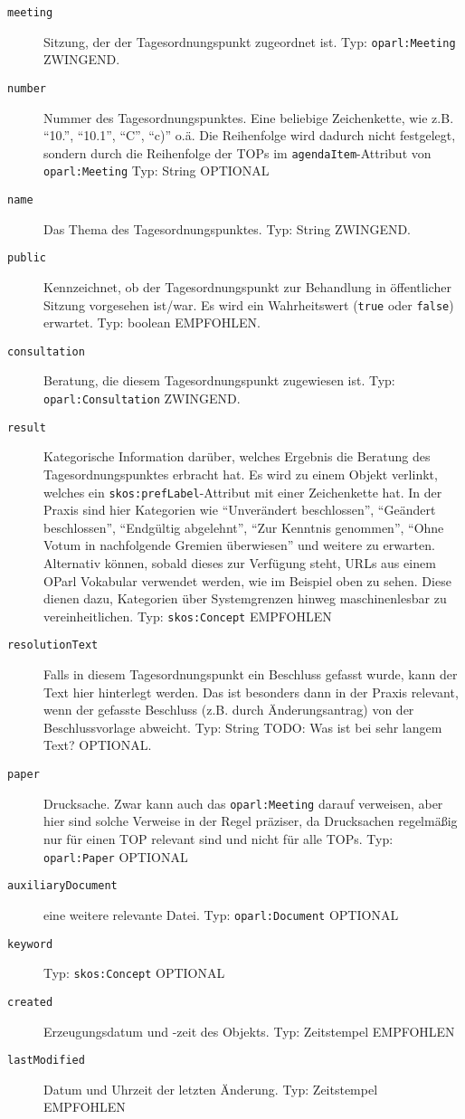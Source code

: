 \documentclass[,a4paper]{article}
\begin{document}
\begin{description}
\item[\texttt{meeting}]
Sitzung, der der Tagesordnungspunkt zugeordnet ist. Typ:
\texttt{oparl:Meeting} ZWINGEND.
\item[\texttt{number}]
Nummer des Tagesordnungspunktes. Eine beliebige Zeichenkette, wie z.B.
``10.'', ``10.1'', ``C'', ``c)'' o.ä. Die Reihenfolge wird dadurch nicht
festgelegt, sondern durch die Reihenfolge der TOPs im
\texttt{agendaItem}-Attribut von \texttt{oparl:Meeting} Typ: String
OPTIONAL
\item[\texttt{name}]
Das Thema des Tagesordnungspunktes. Typ: String ZWINGEND.
\item[\texttt{public}]
Kennzeichnet, ob der Tagesordnungspunkt zur Behandlung in öffentlicher
Sitzung vorgesehen ist/war. Es wird ein Wahrheitswert (\texttt{true}
oder \texttt{false}) erwartet. Typ: boolean EMPFOHLEN.
\item[\texttt{consultation}]
Beratung, die diesem Tagesordnungspunkt zugewiesen ist. Typ:
\texttt{oparl:Consultation} ZWINGEND.
\item[\texttt{result}]
Kategorische Information darüber, welches Ergebnis die Beratung des
Tagesordnungspunktes erbracht hat. Es wird zu einem Objekt verlinkt,
welches ein \texttt{skos:prefLabel}-Attribut mit einer Zeichenkette hat.
In der Praxis sind hier Kategorien wie ``Unverändert beschlossen'',
``Geändert beschlossen'', ``Endgültig abgelehnt'', ``Zur Kenntnis
genommen'', ``Ohne Votum in nachfolgende Gremien überwiesen'' und
weitere zu erwarten. Alternativ können, sobald dieses zur Verfügung
steht, URLs aus einem OParl Vokabular verwendet werden, wie im Beispiel
oben zu sehen. Diese dienen dazu, Kategorien über Systemgrenzen hinweg
maschinenlesbar zu vereinheitlichen. Typ: \texttt{skos:Concept}
EMPFOHLEN
\item[\texttt{resolutionText}]
Falls in diesem Tagesordnungspunkt ein Beschluss gefasst wurde, kann der
Text hier hinterlegt werden. Das ist besonders dann in der Praxis
relevant, wenn der gefasste Beschluss (z.B. durch Änderungsantrag) von
der Beschlussvorlage abweicht. Typ: String TODO: Was ist bei sehr langem
Text? OPTIONAL.
\item[\texttt{paper}]
Drucksache. Zwar kann auch das \texttt{oparl:Meeting} darauf verweisen,
aber hier sind solche Verweise in der Regel präziser, da Drucksachen
regelmäßig nur für einen TOP relevant sind und nicht für alle TOPs. Typ:
\texttt{oparl:Paper} OPTIONAL
\item[\texttt{auxiliaryDocument}]
eine weitere relevante Datei. Typ: \texttt{oparl:Document} OPTIONAL
\item[\texttt{keyword}]
Typ: \texttt{skos:Concept} OPTIONAL
\item[\texttt{created}]
Erzeugungsdatum und -zeit des Objekts. Typ: Zeitstempel EMPFOHLEN
\item[\texttt{lastModified}]
Datum und Uhrzeit der letzten Änderung. Typ: Zeitstempel EMPFOHLEN
\end{description}
\end{document}
